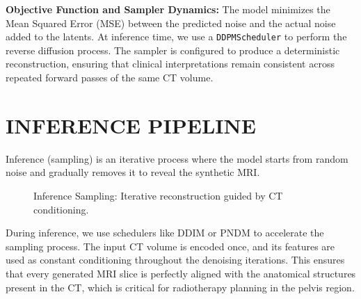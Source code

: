 \documentclass[10pt,a4paper]{article}
\begin{document}
\textbf{Objective Function and Sampler Dynamics:} 
The model minimizes the Mean Squared Error (MSE) between the predicted noise and the actual noise added to the latents. At inference time, we use a \texttt{DDPMScheduler} to perform the reverse diffusion process. The sampler is configured to produce a deterministic reconstruction, ensuring that clinical interpretations remain consistent across repeated forward passes of the same CT volume.

\section{INFERENCE PIPELINE}
Inference (sampling) is an iterative process where the model starts from random noise and gradually removes it to reveal the synthetic MRI.

\begin{figure}[H]
\centering
{}
\caption{Inference Sampling: Iterative reconstruction guided by CT conditioning.}
\end{figure}

During inference, we use schedulers like DDIM or PNDM to accelerate the sampling process. The input CT volume is encoded once, and its features are used as constant conditioning throughout the denoising iterations. This ensures that every generated MRI slice is perfectly aligned with the anatomical structures present in the CT, which is critical for radiotherapy planning in the pelvis region.
\end{document}
